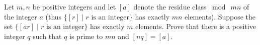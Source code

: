 Let $m, n$ be positive integers and let $[a]$ denote the residue class $\bmod\
mn$ of the integer $a$ (thus $\lbrace [r] \mid r \text{ is an integer} \rbrace$
has exactly $mn$ elements). Suppose the set $\lbrace [ar] \mid r \text{ is an
integer} \rbrace$ has exactly $m$ elements. Prove that there is a positive
integer $q$ such that $q$ is prime to $mn$ and $[nq] = [a]$.

